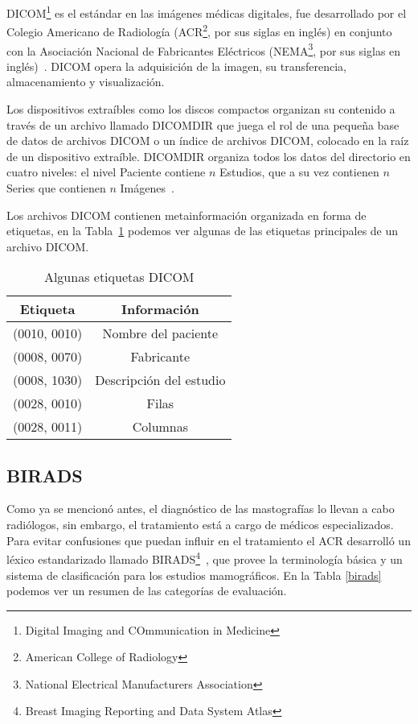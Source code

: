 DICOM\footnote{Digital Imaging and COmmunication in Medicine} es el estándar en
las imágenes médicas digitales, fue desarrollado por el Colegio Americano de
Radiología (ACR\footnote{American College of Radiology}, por sus siglas en
inglés) en conjunto con la Asociación Nacional de Fabricantes Eléctricos
(NEMA\footnote{National Electrical Manufacturers Association}, por sus siglas
en inglés)~\cite{national1996digital}. DICOM opera la adquisición de la imagen,
su transferencia, almacenamiento y visualización.

Los dispositivos extraíbles como los discos compactos organizan su contenido a
través de un archivo llamado DICOMDIR que juega el rol de una pequeña base de
datos de archivos DICOM o un índice de archivos DICOM, colocado en la raíz de
un dispositivo extraíble. DICOMDIR organiza todos los datos del directorio en
cuatro niveles: el nivel Paciente contiene $n$ Estudios, que a su vez contienen
$n$ Series que contienen $n$ Imágenes~\cite{pianykh2011digital}.

Los archivos DICOM contienen metainformación organizada en forma de etiquetas,
en la Tabla~\ref{dicom:tags} podemos ver algunas de las etiquetas principales
de un archivo DICOM.

\begin{table}
  \caption[Etiquetas DICOM]{Algunas etiquetas DICOM}
  \label{dicom:tags}
\begin{center}
{\scriptsize
    \begin{tabular}{c|c}
    \hline
    {\bf Etiqueta} &
    {\bf Información} \\
    \hline
    (0010, 0010) & Nombre del paciente\\
    (0008, 0070) & Fabricante\\
    (0008, 1030) & Descripción del estudio\\
    (0028, 0010) & Filas\\
    (0028, 0011) & Columnas\\
    \hline
    \end{tabular}
}
\end{center}
\end{table}

\subsection{BIRADS}

Como ya se mencionó antes, el diagnóstico de las mastografías lo llevan a cabo
radiólogos, sin embargo, el tratamiento está a cargo de médicos especializados.
Para evitar confusiones que puedan influir en el tratamiento el ACR desarrolló
un léxico estandarizado llamado BIRADS\footnote{Breast Imaging Reporting and
Data System Atlas}~\cite{reston2003birads}, que provee la terminología básica
y un sistema de clasificación para los estudios mamográficos. En la Tabla
\ref{birads} podemos ver un resumen de las categorías de evaluación.


